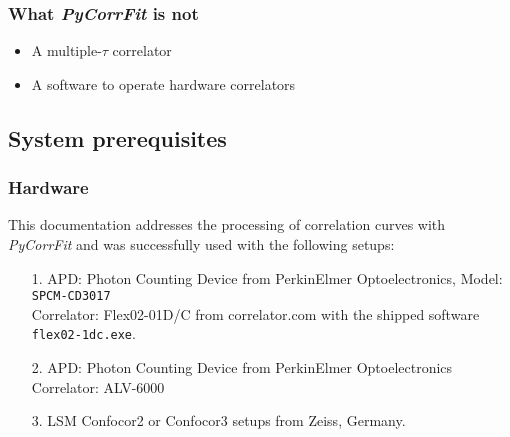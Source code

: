 \subsubsection*{What \textit{PyCorrFit} is not}
\begin{itemize}
\item A multiple-$\tau$ correlator
\item A software to operate hardware correlators
\end{itemize}

\subsection{System prerequisites}
\label{sec:intro.prere}
\subsubsection{Hardware}
\label{sec:intro.prere.hardw}
This documentation addresses the processing of correlation curves with \textit{PyCorrFit} and was successfully used with the following setups:
\begin{itemize}
\item[1.]
     APD: Photon Counting Device from PerkinElmer Optoelectronics, Model: 	 \texttt{SPCM-CD3017}\\
     Correlator: Flex02-01D/C from correlator.com with the shipped software 	
	    		 \texttt{flex02-1dc.exe}.
\item[2.]
    APD: Photon Counting Device from PerkinElmer Optoelectronics\\
    Correlator: ALV-6000
\item[3.] LSM Confocor2 or Confocor3 setups from Zeiss, Germany.
\end{itemize}

